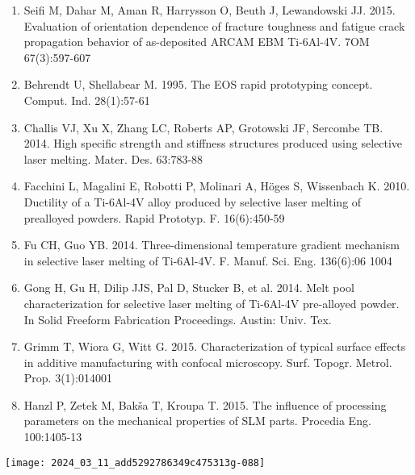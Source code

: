 \documentclass[10pt]{article}
\begin{document}
\begin{enumerate}
  \item Seifi M, Dahar M, Aman R, Harrysson O, Beuth J, Lewandowski JJ. 2015. Evaluation of orientation dependence of fracture toughness and fatigue crack propagation behavior of as-deposited ARCAM EBM Ti-6Al-4V. 7OM 67(3):597-607

  \item Behrendt U, Shellabear M. 1995. The EOS rapid prototyping concept. Comput. Ind. 28(1):57-61

  \item Challis VJ, Xu X, Zhang LC, Roberts AP, Grotowski JF, Sercombe TB. 2014. High specific strength and stiffness structures produced using selective laser melting. Mater. Des. 63:783-88

  \item Facchini L, Magalini E, Robotti P, Molinari A, Höges S, Wissenbach K. 2010. Ductility of a Ti-6Al-4V alloy produced by selective laser melting of prealloyed powders. Rapid Prototyp. F. 16(6):450-59

  \item Fu CH, Guo YB. 2014. Three-dimensional temperature gradient mechanism in selective laser melting of Ti-6Al-4V. F. Manuf. Sci. Eng. 136(6):06 1004

  \item Gong H, Gu H, Dilip JJS, Pal D, Stucker B, et al. 2014. Melt pool characterization for selective laser melting of Ti-6Al-4V pre-alloyed powder. In Solid Freeform Fabrication Proceedings. Austin: Univ. Tex.

  \item Grimm T, Wiora G, Witt G. 2015. Characterization of typical surface effects in additive manufacturing with confocal microscopy. Surf. Topogr. Metrol. Prop. 3(1):014001

  \item Hanzl P, Zetek M, Bakša T, Kroupa T. 2015. The influence of processing parameters on the mechanical properties of SLM parts. Procedia Eng. 100:1405-13

\end{enumerate}

\begin{center}
\texttt{[image: 2024\_03\_11\_add5292786349c475313g-088]}
\end{center}
\end{document}
